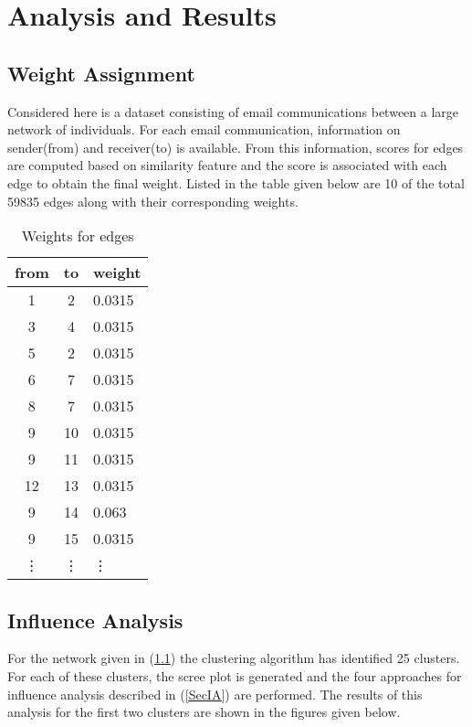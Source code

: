 \chapter{Analysis and Results}
\ifpdf
    \graphicspath{{Chapter3/Chapter3Figs/PNG/}{Chapter3/Chapter3Figs/PDF/}{Chapter3/Chapter3Figs/}}
\else
    \graphicspath{{Chapter3/Chapter3Figs/EPS/}{Chapter3/Chapter3Figs/}}
\fi

\section{Weight Assignment}
 
Considered here is a dataset consisting of email communications between a large network of individuals. For each email communication, information on sender(from) and receiver(to) is available. From this information, scores for edges are computed based on similarity feature and the score is associated with each edge to obtain the final weight.
Listed in the table given below are 10 of the total 59835 edges along with their corresponding weights.
  
\begin{table}[htb]
\caption{Weights for edges}
\begin{tabular}{ccl}\hline
from & to & weight\\ \hline
1 & 2 & 0.0315\\
3 & 4 & 0.0315\\
5 & 2 & 0.0315\\
6 & 7 & 0.0315\\
8 & 7 & 0.0315\\
9 & 10 & 0.0315\\
9 & 11 & 0.0315\\
12 & 13 & 0.0315\\
9 & 14 & 0.063\\
9 & 15 & 0.0315\\
\vdots&\vdots&\vdots\\ \hline
\end{tabular}\label{Table1}
\end{table}

\section{Influence Analysis}

For the network given in (\ref{Table1}) the clustering algorithm has identified 25 clusters. For each of these clusters, the scree plot is generated and the four approaches for influence analysis described in (\ref{SecIA}) are performed.
The results of this analysis for the first two clusters are shown in the figures given below.

